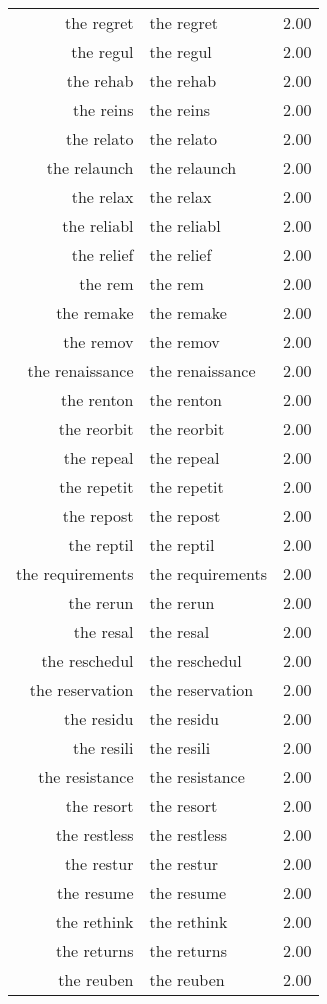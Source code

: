 \begin{table}[ht]
\begin{tabular}{rlr}
  the regret & the regret & 2.00 \\ 
  the regul & the regul & 2.00 \\ 
  the rehab & the rehab & 2.00 \\ 
  the reins & the reins & 2.00 \\ 
  the relato & the relato & 2.00 \\ 
  the relaunch & the relaunch & 2.00 \\ 
  the relax & the relax & 2.00 \\ 
  the reliabl & the reliabl & 2.00 \\ 
  the relief & the relief & 2.00 \\ 
  the rem & the rem & 2.00 \\ 
  the remake & the remake & 2.00 \\ 
  the remov & the remov & 2.00 \\ 
  the renaissance & the renaissance & 2.00 \\ 
  the renton & the renton & 2.00 \\ 
  the reorbit & the reorbit & 2.00 \\ 
  the repeal & the repeal & 2.00 \\ 
  the repetit & the repetit & 2.00 \\ 
  the repost & the repost & 2.00 \\ 
  the reptil & the reptil & 2.00 \\ 
  the requirements & the requirements & 2.00 \\ 
  the rerun & the rerun & 2.00 \\ 
  the resal & the resal & 2.00 \\ 
  the reschedul & the reschedul & 2.00 \\ 
  the reservation & the reservation & 2.00 \\ 
  the residu & the residu & 2.00 \\ 
  the resili & the resili & 2.00 \\ 
  the resistance & the resistance & 2.00 \\ 
  the resort & the resort & 2.00 \\ 
  the restless & the restless & 2.00 \\ 
  the restur & the restur & 2.00 \\ 
  the resume & the resume & 2.00 \\ 
  the rethink & the rethink & 2.00 \\ 
  the returns & the returns & 2.00 \\ 
  the reuben & the reuben & 2.00 \\ 

\end{tabular}
\end{table}

